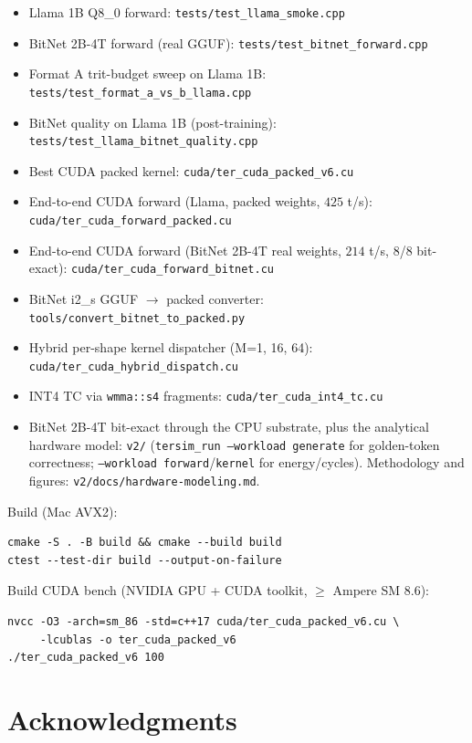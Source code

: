 \documentclass{article}
\begin{document}
\begin{itemize}
  \item Llama 1B Q8\_0 forward: \texttt{tests/test\_llama\_smoke.cpp}
  \item BitNet 2B-4T forward (real GGUF): \texttt{tests/test\_bitnet\_forward.cpp}
  \item Format A trit-budget sweep on Llama 1B: \texttt{tests/test\_format\_a\_vs\_b\_llama.cpp}
  \item BitNet quality on Llama 1B (post-training): \texttt{tests/test\_llama\_bitnet\_quality.cpp}
  \item Best {CUDA} packed kernel: \texttt{cuda/ter\_cuda\_packed\_v6.cu}
  \item End-to-end {CUDA} forward (Llama, packed weights, $425$ t/s):
    \texttt{cuda/ter\_cuda\_forward\_packed.cu}
  \item End-to-end {CUDA} forward (BitNet 2B-4T real weights,
    $214$ t/s, 8/8 bit-exact): \texttt{cuda/ter\_cuda\_forward\_bitnet.cu}
  \item BitNet i2\_s {GGUF} $\rightarrow$ packed converter:
    \texttt{tools/convert\_bitnet\_to\_packed.py}
  \item Hybrid per-shape kernel dispatcher (M=1, 16, 64):
    \texttt{cuda/ter\_cuda\_hybrid\_dispatch.cu}
  \item {INT4} {TC} via \texttt{wmma::s4} fragments:
    \texttt{cuda/ter\_cuda\_int4\_tc.cu}
  \item BitNet 2B-4T bit-exact through the {CPU} substrate, plus the
    analytical hardware model: \texttt{v2/} (\texttt{tersim\_run
    --workload generate} for golden-token correctness;
    \texttt{--workload forward}/\texttt{kernel} for energy/cycles).
    Methodology and figures: \texttt{v2/docs/hardware-modeling.md}.
\end{itemize}

Build (Mac AVX2):
\begin{lstlisting}
cmake -S . -B build && cmake --build build
ctest --test-dir build --output-on-failure
\end{lstlisting}

Build {CUDA} bench (NVIDIA GPU + CUDA toolkit, $\geq$ Ampere SM 8.6):
\begin{lstlisting}
nvcc -O3 -arch=sm_86 -std=c++17 cuda/ter_cuda_packed_v6.cu \
     -lcublas -o ter_cuda_packed_v6
./ter_cuda_packed_v6 100
\end{lstlisting}

\section*{Acknowledgments}
\end{document}
